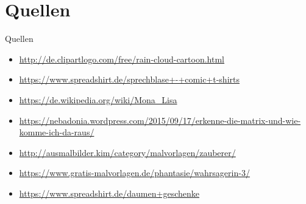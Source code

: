 \documentclass[19pt]{beamer}
\begin{document}
\section{Quellen}
\begin{frame}{Quellen}
	\begin{itemize}
		\item \url{http://de.clipartlogo.com/free/rain-cloud-cartoon.html}
		\item \url{https://www.spreadshirt.de/sprechblase+-+comic+t-shirts}
		\item \url{https://de.wikipedia.org/wiki/Mona_Lisa}
		\item \url{https://nebadonia.wordpress.com/2015/09/17/erkenne-die-matrix-und-wie-komme-ich-da-raus/}
		\item \url{http://ausmalbilder.kim/category/malvorlagen/zauberer/}
		\item \url{https://www.gratis-malvorlagen.de/phantasie/wahrsagerin-3/}
		\item \url{https://www.spreadshirt.de/daumen+geschenke}
	\end{itemize}
\end{frame}
\end{document}
